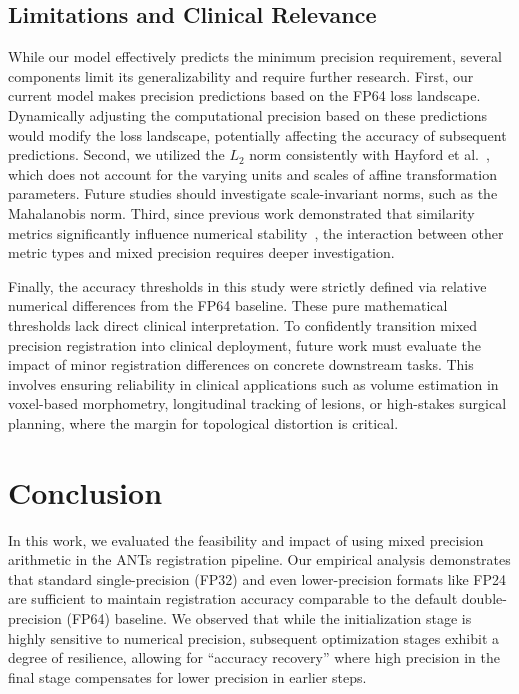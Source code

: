 \documentclass[journal,twoside,web]{ieeecolor}
\begin{document}
\subsection{Limitations and Clinical Relevance}
While our model effectively predicts the minimum precision requirement, several components limit its generalizability and require further research. First, our current model makes precision predictions based on the FP64 loss landscape. Dynamically adjusting the computational precision based on these predictions would modify the loss landscape, potentially affecting the accuracy of subsequent predictions. Second, we utilized the $L_2$ norm consistently with Hayford et al.~\cite{Hayford2024-kb}, which does not account for the varying units and scales of affine transformation parameters. Future studies should investigate scale-invariant norms, such as the Mahalanobis norm. Third, since previous work demonstrated that similarity metrics significantly influence numerical stability~\cite{Mirhakimi2025-qb}, the interaction between other metric types and mixed precision requires deeper investigation.

Finally, the accuracy thresholds in this study were strictly defined via relative numerical differences from the FP64 baseline. These pure mathematical thresholds lack direct clinical interpretation. To confidently transition mixed precision registration into clinical deployment, future work must evaluate the impact of minor registration differences on concrete downstream tasks. This involves ensuring reliability in clinical applications such as volume estimation in voxel-based morphometry, longitudinal tracking of lesions, or high-stakes surgical planning, where the margin for topological distortion is critical.

\section{Conclusion}
\label{sec:conclusion}
In this work, we evaluated the feasibility and impact of using mixed precision arithmetic in the ANTs registration pipeline. Our empirical analysis demonstrates that standard single-precision (FP32) and even lower-precision formats like FP24 are sufficient to maintain registration accuracy comparable to the default double-precision (FP64) baseline. We observed that while the initialization stage is highly sensitive to numerical precision, subsequent optimization stages exhibit a degree of resilience, allowing for ``accuracy recovery'' where high precision in the final stage compensates for lower precision in earlier steps.
\end{document}
